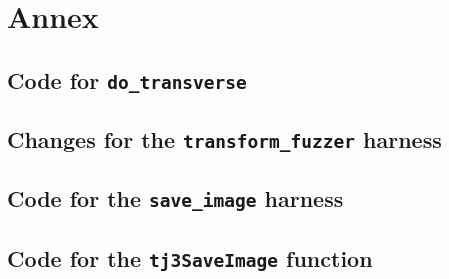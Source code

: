 \documentclass[12pt]{article}
\begin{document}
\section{Annex}
\subsection{Code for \texttt{do\_transverse}}
\label{transverse}


\subsection{Changes for the  \texttt{transform\_fuzzer} harness}
\label{transFuzzer}


\subsection{Code for the \texttt{save\_image} harness}
\label{saveImageFuzzer}


\subsection{Code for the \texttt{tj3SaveImage} function}
\label{saveImage}

\end{document}
